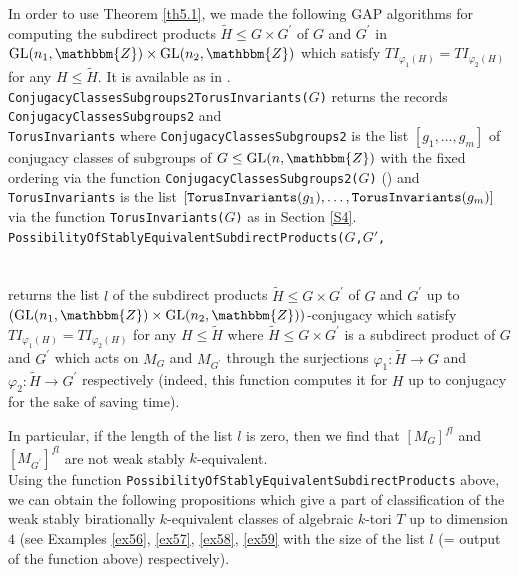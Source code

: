 \documentclass{amsart}
\theoremstyle{plain}
\theoremstyle{definition}
\theoremstyle{remark}
\newcommand{\bZ}{\mathbbm{Z}}\newcommand{\bQ}{\mathbbm{Q}}
\newcommand{\GL}{{\rm GL}}\newcommand{\SL}{{\rm SL}}
\newcounter{sub}\def\tr{\mbox{tr }}
\begin{document}
In order to use Theorem \ref{th5.1}, 
we made the following GAP \cite{GAP} algorithms 
for computing the subdirect products 
$\widetilde{H}\leq G\times G^\prime$ of $G$ and $G^\prime$ 
in $\GL(n_1,\bZ)\times \GL(n_2,\bZ)$ 
which satisfy $TI_{\varphi_1(H)}=TI_{\varphi_2(H)}$ 
for any $H\leq \widetilde{H}$. 
It is available as in \cite{BCAlgTori}.\\

\noindent 
{\tt ConjugacyClassesSubgroups2TorusInvariants($G$)} returns 
the records 
{\tt ConjugacyClassesSubgroups2} and\\ 
{\tt TorusInvariants} 
where 
{\tt ConjugacyClassesSubgroups2} 
is the list $[g_1,\ldots,g_m]$ 
of conjugacy classes of subgroups of $G\leq \GL(n,\bZ)$ 
with the fixed ordering via the function 
{\tt ConjugacyClassesSubgroups2(}$G${\tt )} 
(\cite[Section 4.1]{HY17}) and 
{\tt TorusInvariants} is the list 
$[{\tt TorusInvariants}(g_1),\ldots,{\tt TorusInvariants}(g_m)]$ 
via the function {\tt TorusInvariants($G$)} as in Section \ref{S4}.\\ 

\noindent 
{\tt PossibilityOfStablyEquivalentSubdirectProducts($G$,$G'$,}\\
\\
\\
returns the list $l$ of the subdirect products 
$\widetilde{H}\leq G\times G^\prime$ of $G$ and $G^\prime$ 
up to $(\GL(n_1,\bZ)\times \GL(n_2,\bZ))$-conjugacy  
which satisfy $TI_{\varphi_1(H)}=TI_{\varphi_2(H)}$ 
for any $H\leq \widetilde{H}$ 
where $\widetilde{H}\leq G\times G^\prime$ 
is a subdirect product of $G$ and $G^\prime$ 
which acts on $M_G$ and $M_{G^\prime}$ 
through the surjections $\varphi_1: \widetilde{H} \rightarrow G$ 
and $\varphi_2: \widetilde{H} \rightarrow G^\prime$ respectively 
(indeed, this function computes it for $H$ up to conjugacy 
for the sake of saving time).

In particular, if the length of the list $l$ is zero, then 
we find that $[M_G]^{fl}$ and $[M_{G^\prime}]^{fl}$ 
are not weak stably $k$-equivalent.\\

Using the function {\tt PossibilityOfStablyEquivalentSubdirectProducts} 
above, we can obtain the following propositions which 
give a part of classification of the weak stably birationally 
$k$-equivalent classes of algebraic $k$-tori $T$ up to dimension $4$ 
(see Examples \ref{ex56}, \ref{ex57}, \ref{ex58}, \ref{ex59} 
with the size of the list $l$ 
(= output of the function above) respectively). 
\end{document}
